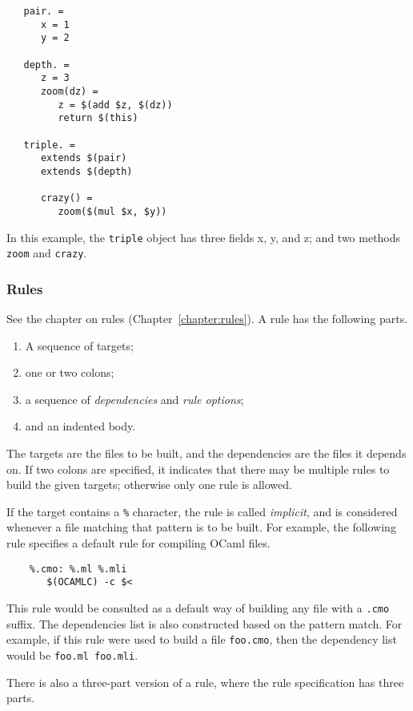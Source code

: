\begin{verbatim}
   pair. =
      x = 1
      y = 2

   depth. =
      z = 3
      zoom(dz) =
         z = $(add $z, $(dz))
         return $(this)

   triple. =
      extends $(pair)
      extends $(depth)

      crazy() =
         zoom($(mul $x, $y))
\end{verbatim}

In this example, the \verb+triple+ object has three fields x, y, and z; and two methods \verb+zoom+
and \verb+crazy+.

\subsubsection{Rules}

See the chapter on rules (Chapter~\ref{chapter:rules}).  A rule has the following parts.
\begin{enumerate}
\item A sequence of targets;
\item one or two colons;
\item a sequence of \emph{dependencies} and \emph{rule options};
\item and an indented body.
\end{enumerate}

The targets are the files to be built, and the dependencies are the files it depends on.  If two
colons are specified, it indicates that there may be multiple rules to build the given targets;
otherwise only one rule is allowed.

If the target contains a \verb+%+ character, the rule is called \emph{implicit}, and is considered
whenever a file matching that pattern is to be built.  For example, the following rule specifies a
default rule for compiling OCaml files.

\begin{verbatim}
    %.cmo: %.ml %.mli
       $(OCAMLC) -c $<
\end{verbatim}

This rule would be consulted as a default way of building any file with a \verb+.cmo+ suffix.  The
dependencies list is also constructed based on the pattern match.  For example, if this rule were
used to build a file \verb+foo.cmo+, then the dependency list would be \verb+foo.ml foo.mli+.

There is also a three-part version of a rule, where the rule specification has three parts.

